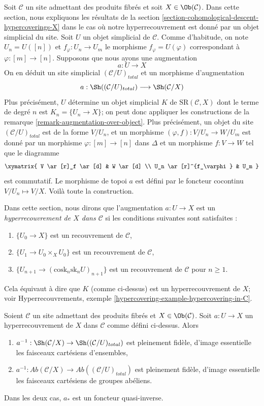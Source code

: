 \noindent
Soit $\mathcal{C}$ un site admettant des produits fibrés et
soit $X \in \Ob(\mathcal{C})$.
Dans cette section, nous expliquons les résultats de la section
\ref{section-cohomological-descent-hypercoverings-X}
dans le cas où notre hyperrecouvrement est donné par
un objet simplicial du site.
Soit $U$ un objet simplicial de $\mathcal{C}$.
Comme d'habitude, on note $U_n = U([n])$ et $f_\varphi : U_n \to U_m$
le morphisme $f_\varphi = U(\varphi)$ correspondant à
$\varphi : [m] \to [n]$.
Supposons que nous ayons une augmentation
$$
a : U \to X
$$
On en déduit un site simplicial $(\mathcal{C}/U)_{total}$
et un morphisme d'augmentation
$$
a : \Sh((\mathcal{C}/U)_{total}) \longrightarrow \Sh(\mathcal{C}/X)
$$
Plus précisément, $U$ détermine un objet simplicial $K$ de
$\text{SR}(\mathcal{C}, X)$ dont le terme de degré $n$ est
$K_n = \{U_n \to X\}$; on peut donc appliquer les constructions de la
remarque \ref{remark-augmentation-over-object}.
Plus précisément, un objet du site $(\mathcal{C}/U)_{total}$ est de la forme
$V/U_n$, et un morphisme $(\varphi, f) : V/U_n \to W/U_m$ est donné
par un morphisme $\varphi : [m] \to [n]$ dans $\Delta$ et un morphisme
$f : V \to W$ tel que le diagramme
$$
\xymatrix{
V \ar[r]_f \ar[d] & W \ar[d] \\
U_n \ar[r]^{f_\varphi} & U_m
}
$$
est commutatif. Le morphisme de topoi $a$ est défini par le foncteur cocontinu
$V/U_n \mapsto V/X$. Voilà toute la construction.

\medskip\noindent
Dans cette section, nous dirons que l'augmentation $a : U \to X$ est un
{\it hyperrecouvrement de $X$ dans $\mathcal{C}$} si les conditions suivantes sont satisfaites :
\begin{enumerate}
\item $\{U_0 \to X\}$ est un recouvrement de $\mathcal{C}$,
\item $\{U_1 \to U_0 \times_X U_0\}$ est un recouvrement de $\mathcal{C}$,
\item $\{U_{n + 1} \to (\text{cosk}_n\text{sk}_n U)_{n + 1}\}$
est un recouvrement de $\mathcal{C}$ pour $n \geq 1$.
\end{enumerate}
Cela équivaut à dire que $K$ (comme ci-dessus) est un hyperrecouvrement
de $X$; voir
Hyperrecouvrements, exemple \ref{hypercovering-example-hypercovering-in-C}.

\begin{lemma}
\label{lemma-hypercovering-X-simple-descent-sheaves}
Soient $\mathcal{C}$ un site admettant des produits fibrés et $X \in \Ob(\mathcal{C})$.
Soit $a : U \to X$ un hyperrecouvrement de $X$ dans $\mathcal{C}$ comme défini ci-dessus.
Alors
\begin{enumerate}
\item $a^{-1} : \Sh(\mathcal{C}/X) \to \Sh((\mathcal{C}/U)_{total})$
est pleinement fidèle, d'image essentielle les faisceaux cartésiens d'ensembles,
\item $a^{-1} : \textit{Ab}(\mathcal{C}/X) \to
\textit{Ab}((\mathcal{C}/U)_{total})$
est pleinement fidèle, d'image essentielle les faisceaux cartésiens
de groupes abéliens.
\end{enumerate}
Dans les deux cas, $a_*$ est un foncteur quasi-inverse.
\end{lemma}

